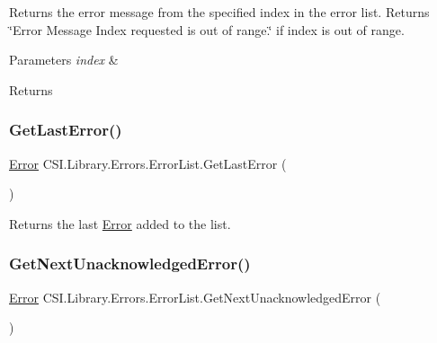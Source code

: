 Returns the error message from the specified index in the error list. Returns \char`\"{}\+Error Message Index requested is out of range.\char`\"{} if index is out of range. 


\begin{DoxyParams}{Parameters}
{\em index} & \\
\hline
\end{DoxyParams}
\begin{DoxyReturn}{Returns}

\end{DoxyReturn}
\mbox{\label{class_c_s_i_1_1_library_1_1_errors_1_1_error_list_ae27914b1f1d58e41cc39cd4ec978a1b5}} 
\subsubsection{\texorpdfstring{GetLastError()}{GetLastError()}}
{\footnotesize\ttfamily \mbox{\hyperlink{class_c_s_i_1_1_library_1_1_errors_1_1_error}{Error}} C\+S\+I.\+Library.\+Errors.\+Error\+List.\+Get\+Last\+Error (\begin{DoxyParamCaption}{ }\end{DoxyParamCaption})\hspace{0.3cm}{\ttfamily [inline]}}



Returns the last \mbox{\hyperlink{class_c_s_i_1_1_library_1_1_errors_1_1_error}{Error}} added to the list. 

\mbox{\label{class_c_s_i_1_1_library_1_1_errors_1_1_error_list_af489d3e731d11a389d011990ee3a9915}} 
\subsubsection{\texorpdfstring{GetNextUnacknowledgedError()}{GetNextUnacknowledgedError()}}
{\footnotesize\ttfamily \mbox{\hyperlink{class_c_s_i_1_1_library_1_1_errors_1_1_error}{Error}} C\+S\+I.\+Library.\+Errors.\+Error\+List.\+Get\+Next\+Unacknowledged\+Error (\begin{DoxyParamCaption}{ }\end{DoxyParamCaption})\hspace{0.3cm}{\ttfamily [inline]}}



